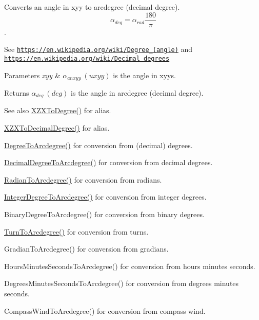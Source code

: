 Converts an angle in xyy to arcdegree (decimal degree). \[\alpha_{deg}=\alpha_{rad}\frac{180}{\pi}\]. 

See \href{https://en.wikipedia.org/wiki/Degree_(angle)}{\tt https\+://en.\+wikipedia.\+org/wiki/\+Degree\+\_\+(angle)} and \href{https://en.wikipedia.org/wiki/Decimal_degrees}{\tt https\+://en.\+wikipedia.\+org/wiki/\+Decimal\+\_\+degrees} 
\begin{DoxyParams}{Parameters}
{\em xyy} & $\alpha_{anxyy}\ (uxyy)$ is the angle in xyys. \\
\hline
\end{DoxyParams}
\begin{DoxyReturn}{Returns}
$\alpha_{deg}\ (deg)$ is the angle in arcdegree (decimal degree). 
\end{DoxyReturn}
\begin{DoxySeeAlso}{See also}
\mbox{\hyperlink{group___e_g_x_math-_angle_conversions-_x_z_x_gaf91d111a3f3558dcd147d3832afc1fd6}{X\+Z\+X\+To\+Degree()}} for alias. 

\mbox{\hyperlink{group___e_g_x_math-_angle_conversions-_x_z_x_ga34889b101a1069ca94a6b899fb98d271}{X\+Z\+X\+To\+Decimal\+Degree()}} for alias. 

\mbox{\hyperlink{group___e_g_x_math-_angle_conversions-_degree_gac1b5f3b68f66c77a6df4ceef842c9b19}{Degree\+To\+Arcdegree()}} for conversion from (decimal) degrees. 

\mbox{\hyperlink{group___e_g_x_math-_angle_conversions-_decimal_degree_gacdd463fcabffeb598ebda65b012ce743}{Decimal\+Degree\+To\+Arcdegree()}} for conversion from decimal degrees. 

\mbox{\hyperlink{group___e_g_x_math-_angle_conversions-_radian_ga3dfdc97357cc07f8379976bbc08f9852}{Radian\+To\+Arcdegree()}} for conversion from radians. 

\mbox{\hyperlink{group___e_g_x_math-_angle_conversions-_integer_degree_gaf633d0b82bfb7586ce86ffbcf78d8f7a}{Integer\+Degree\+To\+Arcdegree()}} for conversion from integer degrees. 

Binary\+Degree\+To\+Arcdegree() for conversion from binary degrees. 

\mbox{\hyperlink{group___e_g_x_math-_angle_conversions-_turn_ga7bdc3a81ce316dd47b1a3179489fa195}{Turn\+To\+Arcdegree()}} for conversion from turns. 

Gradian\+To\+Arcdegree() for conversion from gradians. 

Hours\+Minutes\+Seconds\+To\+Arcdegree() for conversion from hours minutes seconds. 

Degrees\+Minutes\+Seconds\+To\+Arcdegree() for conversion from degrees minutes seconds. 

Compass\+Wind\+To\+Arcdegree() for conversion from compass wind. 
\end{DoxySeeAlso}
\mbox{\label{group___e_g_x_math-_angle_conversions-_x_z_x_ga291a98dde605fdf092ba16acb2989b84}} 
